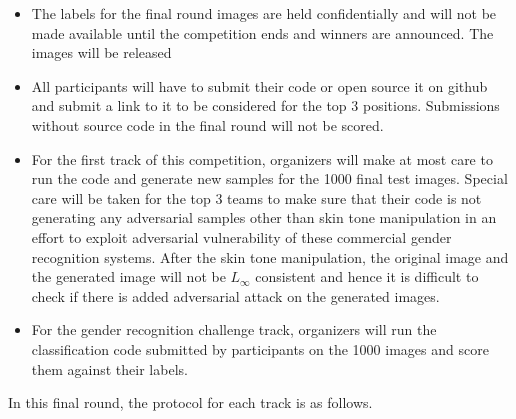 \documentclass[11pt, oneside]{article}
\begin{document}
\begin{itemize}
    \item The labels for the final round images are held confidentially and will not be made available until the competition ends and winners are announced. The images will be released 
    \item All participants will have to submit their code or open source it on github and submit a link to it to be considered for the top 3 positions. Submissions without source code in the final round will not be scored.
    \item For the first track of this competition, organizers will make at most care to run the code and generate new samples for the 1000 final test images. Special care will be taken for the top 3 teams to make sure that their code is not generating any adversarial samples other than skin tone manipulation in an effort to exploit adversarial vulnerability of these commercial gender recognition systems. After the skin tone manipulation, the original image and the generated image will not be $L_{\infty}$ consistent and hence it is difficult to check if there is added adversarial attack on the generated images.
    \item For the gender recognition challenge track, organizers will run the classification code submitted by participants on the 1000 images and score them against their labels. 
\end{itemize}


In this final round, the protocol for each track is as follows. 
\end{document}
